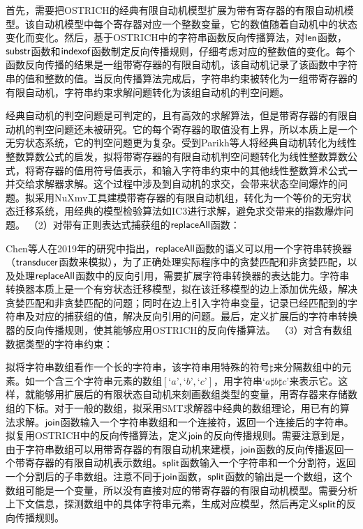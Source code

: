 首先，需要把OSTRICH的经典有限自动机模型扩展为带有寄存器的有限自动机模型。该自动机模型中每个寄存器对应一个整数变量，它的数值随着自动机中的状态变化而变化。然后，基于OSTRICH中的字符串函数反向传播算法，对$\mathsf{len}$函数，$\mathsf{substr}$函数和$\mathsf{indexof}$函数制定反向传播规则，仔细考虑对应的整数值的变化。每个函数反向传播的结果是一组带寄存器的有限自动机，该自动机记录了该函数中字符串的值和整数的值。当反向传播算法完成后，字符串约束被转化为一组带寄存器的有限自动机，字符串约束求解问题转化为该组自动机的判空问题。

经典自动机的判空问题是可判定的，且有高效的求解算法，但是带寄存器的有限自动机的判空问题还未被研究。它的每个寄存器的取值没有上界，所以本质上是一个无穷状态系统，它的判空问题更为复杂。受到Parikh等人\cite{parikh}将经典自动机转化为线性整数算数公式的启发，拟将带寄存器的有限自动机判空问题转化为线性整数算数公式，将寄存器的值用符号值表示，和输入字符串约束中的其他线性整数算术公式一并交给求解器求解。这个过程中涉及到自动机的求交，会带来状态空间爆炸的问题。拟采用NuXmv工具建模带寄存器的有限自动机组，转化为一个等价的无穷状态迁移系统，用经典的模型检验算法如IC3进行求解，避免求交带来的指数爆炸问题。\newline
（2）对带有正则表达式捕获组的$\mathsf{replaceAll}$函数：

Chen等人在2019年的研究\cite{ostrich}中指出，$\mathsf{replaceAll}$函数的语义可以用一个字符串转换器（$\mathsf{transducer}$函数来模拟），为了正确处理实际程序中的贪婪匹配和非贪婪匹配，以及处理$\mathsf{replaceAll}$函数中的反向引用，需要扩展字符串转换器的表达能力。字符串转换器本质上是一个有穷状态迁移模型，拟在该迁移模型的边上添加优先级，解决贪婪匹配和非贪婪匹配的问题；同时在边上引入字符串变量，记录已经匹配到的字符串及对应的捕获组的值，解决反向引用的问题。最后，定义扩展后的字符串转换器的反向传播规则，使其能够应用OSTRICH的反向传播算法。\newline
（3）对含有数组数据类型的字符串约束：

拟将字符串数组看作一个长的字符串，该字符串用特殊的符号$\sharp$来分隔数组中的元素。如一个含三个字符串元素的数组$[‘a’,‘b’,‘c’]$，用字符串$‘a\sharp b\sharp c’$来表示它。这样，就能够用扩展后的有限状态自动机来刻画数组类型的变量，用寄存器来存储数组的下标。对于一般的数组，拟采用SMT求解器中经典的数组理论，用已有的算法求解。$\mathsf{join}$函数输入一个字符串数组和一个连接符，返回一个连接后的字符串。拟复用OSTRICH中的反向传播算法，定义$\mathsf{join}$的反向传播规则。需要注意到是，由于字符串数组可以用带寄存器的有限自动机来建模，$\mathsf{join}$函数的反向传播返回一个带寄存器的有限自动机表示数组。$\mathsf{split}$函数输入一个字符串和一个分割符，返回一个分割后的子串数组。注意不同于$\mathsf{join}$函数，$\mathsf{split}$函数的输出是一个数组，这个数组可能是一个变量，所以没有直接对应的带寄存器的有限自动机模型。需要分析上下文信息，探测数组中的具体字符串元素，生成对应模型，然后再定义$\mathsf{split}$的反向传播规则。
